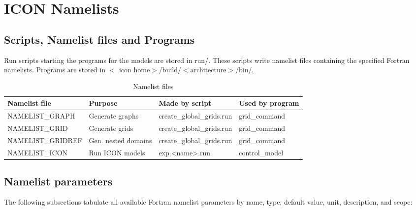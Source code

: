%

\section{ICON Namelists}

\subsection{Scripts, Namelist files and Programs}

Run scripts starting the programs for the
models are stored in run/. These scripts write namelist files containing
the specified Fortran namelists. Programs are stored in $<$ icon home$>$/build/$<$architecture$>$/bin/.


\begin{table}[htb]
\caption{Namelist files}
\begin{center}
\begin{tabular}{llll}\hline
\textbf{Namelist file} & \textbf{Purpose} & \textbf{Made by script} & \textbf{Used by program} \\\hline
NAMELIST\_GRAPH   & Generate graphs     & create\_global\_grids.run & grid\_command \\
NAMELIST\_GRID    & Generate grids      & create\_global\_grids.run & grid\_command \\
NAMELIST\_GRIDREF & Gen. nested domains & create\_global\_grids.run & grid\_command \\
NAMELIST\_ICON    & Run ICON models     & exp.<name>.run & control\_model   \\ \hline
\end{tabular}
\end{center}
\label{table:namelistfiles}
\end{table}

\newpage

\subsection{Namelist parameters}

The following subsections tabulate all available Fortran namelist
parameters by name, type, default value, unit, description, and scope:

